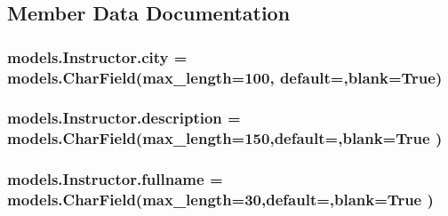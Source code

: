 \subsection{Member Data Documentation}
\subsubsection[{\texorpdfstring{city}{city}}]{\setlength{\rightskip}{0pt plus 5cm}models.\+Instructor.\+city = models.\+Char\+Field(max\+\_\+length=100, default=\textquotesingle{}\textquotesingle{},blank=True)\hspace{0.3cm}{\ttfamily [static]}}\hypertarget{classmodels_1_1_instructor_ac0c4964afe9173812d1579c0ec63f229}{}\label{classmodels_1_1_instructor_ac0c4964afe9173812d1579c0ec63f229}
\subsubsection[{\texorpdfstring{description}{description}}]{\setlength{\rightskip}{0pt plus 5cm}models.\+Instructor.\+description = models.\+Char\+Field(max\+\_\+length=150,default=\textquotesingle{}\textquotesingle{},blank=True )\hspace{0.3cm}{\ttfamily [static]}}\hypertarget{classmodels_1_1_instructor_abccce848362944335f1b25af2bc0f818}{}\label{classmodels_1_1_instructor_abccce848362944335f1b25af2bc0f818}
\subsubsection[{\texorpdfstring{fullname}{fullname}}]{\setlength{\rightskip}{0pt plus 5cm}models.\+Instructor.\+fullname = models.\+Char\+Field(max\+\_\+length=30,default=\textquotesingle{}\textquotesingle{},blank=True )\hspace{0.3cm}{\ttfamily [static]}}\hypertarget{classmodels_1_1_instructor_ad4d39e7d7fffd28664f69c2588e32ae9}{}\label{classmodels_1_1_instructor_ad4d39e7d7fffd28664f69c2588e32ae9}
